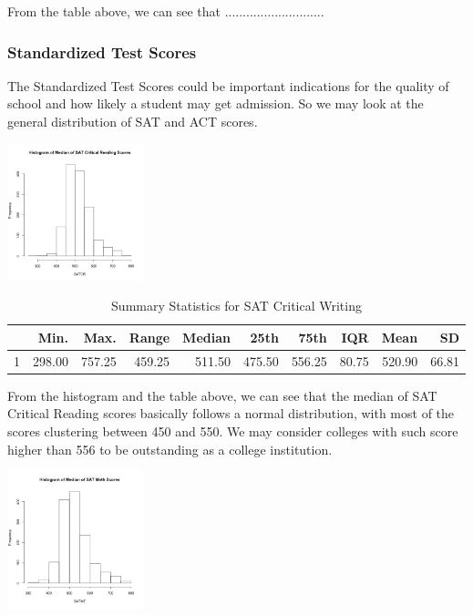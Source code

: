 \documentclass{article}\usepackage[]{graphicx}\usepackage[]{color}
\begin{document}
From the table above, we can see that ............................


\subsubsection{Standardized Test Scores}

The Standardized Test Scores could be important indications for the quality of school and how likely a student may get admission. So we may look at the general distribution of SAT and ACT scores.



{\centering \includegraphics[width=150px]{../../images/histogram-SATCRMedian} 

}


\begin{table}[ht]
\centering
\begin{tabular}{rrrrrrrrrr}
  \hline
 & Min. & Max. & Range & Median & 25th & 75th & IQR & Mean & SD \\ 
  \hline
1 & 298.00 & 757.25 & 459.25 & 511.50 & 475.50 & 556.25 & 80.75 & 520.90 & 66.81 \\ 
   \hline
\end{tabular}
\caption{Summary Statistics for SAT Critical Writing} 
\end{table}


From the histogram and the table above, we can see that the median of SAT Critical Reading scores basically follows a normal distribution, with most of the scores clustering between 450 and 550. We may consider colleges with such score higher than 556 to be outstanding as a college institution.



{\centering \includegraphics[width=150px]{../../images/histogram-SATMTMedian} 

}
\end{document}
